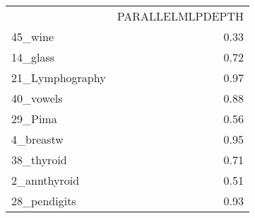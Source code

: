 \begin{tabular}{lr}
 & PARALLELMLPDEPTH \\
45_wine & 0.33 \\
14_glass & 0.72 \\
21_Lymphography & 0.97 \\
40_vowels & 0.88 \\
29_Pima & 0.56 \\
4_breastw & 0.95 \\
38_thyroid & 0.71 \\
2_annthyroid & 0.51 \\
28_pendigits & 0.93 \\
\end{tabular}
